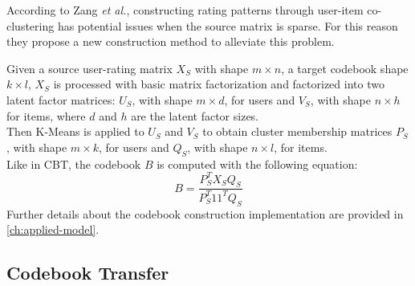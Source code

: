 According to Zang \textit{et al.}, constructing rating patterns through user-item co-clustering has potential issues when the source matrix is sparse. For this reason they propose a new construction method to alleviate this problem.\par
Given a source user-rating matrix $X_S$ with shape $m \times n$, a target codebook shape $k \times l$, $X_S$ is processed with basic matrix factorization and factorized into two latent factor matrices: $U_S$, with shape $m \times d$, for users and $V_S$, with shape $n \times h$ for items, where $d$ and $h$ are the latent factor sizes.\\
Then K-Means is applied to $U_S$ and $V_S$ to obtain cluster membership matrices $P_S$, with shape $m \times k$, for users and $Q_S$, with shape $n \times l$, for items.\\
Like in CBT, the codebook $B$ is computed with the following equation:
\begin{equation}
B = \frac{P_S^T X_S Q_S}{P_S^T 11^T Q_S}
\end{equation}
Further details about the codebook construction implementation are provided in \autoref{ch:applied-model}.


\subsection{Codebook Transfer}

